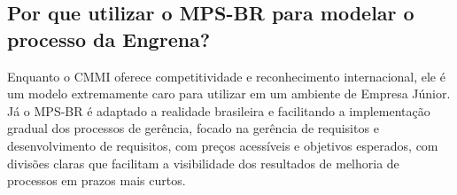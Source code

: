 \subsection{Por que utilizar o MPS-BR para modelar o processo da Engrena?}

Enquanto o CMMI oferece competitividade e reconhecimento internacional, ele é um modelo extremamente caro para utilizar em um ambiente de Empresa Júnior.
Já o MPS-BR é adaptado a realidade brasileira e facilitando a implementação gradual dos processos de gerência, focado na gerência de requisitos e desenvolvimento de requisitos, com preços acessíveis e objetivos esperados, com divisões claras que facilitam a visibilidade dos resultados de melhoria de processos em prazos mais curtos.
